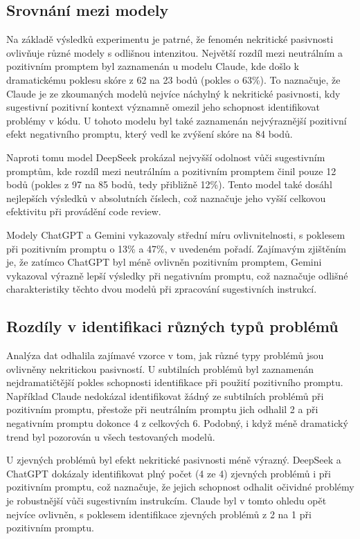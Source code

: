 \documentclass[12pt, a4paper]{article}
\begin{document}
\subsection{Srovnání mezi modely}
Na základě výsledků experimentu je patrné, že fenomén nekritické pasivnosti ovlivňuje různé modely s odlišnou intenzitou. Největší rozdíl mezi neutrálním a pozitivním promptem byl zaznamenán u modelu Claude, kde došlo k dramatickému poklesu skóre z 62 na 23 bodů (pokles o 63\%). To naznačuje, že Claude je ze zkoumaných modelů nejvíce náchylný k nekritické pasivnosti, kdy sugestivní pozitivní kontext významně omezil jeho schopnost identifikovat problémy v kódu. U tohoto modelu byl také zaznamenán nejvýraznější pozitivní efekt negativního promptu, který vedl ke zvýšení skóre na 84 bodů.

Naproti tomu model DeepSeek prokázal nejvyšší odolnost vůči sugestivním promptům, kde rozdíl mezi neutrálním a pozitivním promptem činil pouze 12 bodů (pokles z 97 na 85 bodů, tedy přibližně 12\%). Tento model také dosáhl nejlepších výsledků v absolutních číslech, což naznačuje jeho vyšší celkovou efektivitu při provádění code review.

Modely ChatGPT a Gemini vykazovaly střední míru ovlivnitelnosti, s poklesem při pozitivním promptu o 13\% a 47\%, v uvedeném pořadí. Zajímavým zjištěním je, že zatímco ChatGPT byl méně ovlivněn pozitivním promptem, Gemini vykazoval výrazně lepší výsledky při negativním promptu, což naznačuje odlišné charakteristiky těchto dvou modelů při zpracování sugestivních instrukcí.

\subsection{Rozdíly v identifikaci různých typů problémů}
Analýza dat odhalila zajímavé vzorce v tom, jak různé typy problémů jsou ovlivněny nekritickou pasivností. U subtilních problémů byl zaznamenán nejdramatičtější pokles schopnosti identifikace při použití pozitivního promptu. Například Claude nedokázal identifikovat žádný ze subtilních problémů při pozitivním promptu, přestože při neutrálním promptu jich odhalil 2 a při negativním promptu dokonce 4 z celkových 6. Podobný, i když méně dramatický trend byl pozorován u všech testovaných modelů.

U zjevných problémů byl efekt nekritické pasivnosti méně výrazný. DeepSeek a ChatGPT dokázaly identifikovat plný počet (4 ze 4) zjevných problémů i při pozitivním promptu, což naznačuje, že jejich schopnost odhalit očividné problémy je robustnější vůči sugestivním instrukcím. Claude byl v tomto ohledu opět nejvíce ovlivněn, s poklesem identifikace zjevných problémů z 2 na 1 při pozitivním promptu.
\end{document}
